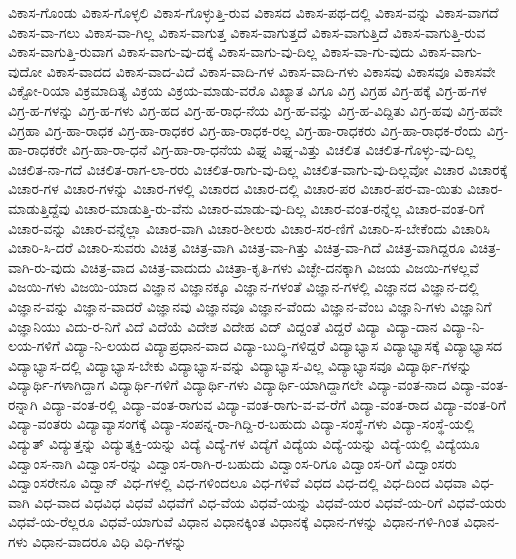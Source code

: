 {ವಿಕಾಸ-ಗೊಂಡು
ವಿಕಾಸ-ಗೊಳ್ಳಲಿ
ವಿಕಾಸ-ಗೊಳ್ಳುತ್ತಿ-ರುವ
ವಿಕಾಸದ
ವಿಕಾಸ-ಪಥ-ದಲ್ಲಿ
ವಿಕಾಸ-ವನ್ನು
ವಿಕಾಸ-ವಾಗದೆ
ವಿಕಾಸ-ವಾ-ಗಲು
ವಿಕಾಸ-ವಾ-ಗಿಲ್ಲ
ವಿಕಾಸ-ವಾಗುತ್ತ
ವಿಕಾಸ-ವಾಗುತ್ತದೆ
ವಿಕಾಸ-ವಾಗುತ್ತಿದೆ
ವಿಕಾಸ-ವಾಗುತ್ತಿ-ರುವ
ವಿಕಾಸ-ವಾಗುತ್ತಿ-ರುವಾಗ
ವಿಕಾಸ-ವಾಗು-ವು-ದಕ್ಕೆ
ವಿಕಾಸ-ವಾಗು-ವು-ದಿಲ್ಲ
ವಿಕಾಸ-ವಾ-ಗು-ವುದು
ವಿಕಾಸ-ವಾಗು-ವುದೋ
ವಿಕಾಸ-ವಾದದ
ವಿಕಾಸ-ವಾದ-ವಿದೆ
ವಿಕಾಸ-ವಾದಿ-ಗಳ
ವಿಕಾಸ-ವಾದಿ-ಗಳು
ವಿಕಾಸವು
ವಿಕಾಸವೂ
ವಿಕಾಸವೇ
ವಿಕ್ಟೋ-ರಿಯಾ
ವಿಕ್ರಮಾದಿತ್ಯ
ವಿಕ್ರಯ
ವಿಕ್ರಯ-ಮಾಡು-ವರೊ
ವಿಖ್ಯಾತ
ವಿಗೂ
ವಿಗ್ರ
ವಿಗ್ರಹ
ವಿಗ್ರ-ಹಕ್ಕೆ
ವಿಗ್ರ-ಹ-ಗಳ
ವಿಗ್ರ-ಹ-ಗಳನ್ನು
ವಿಗ್ರ-ಹ-ಗಳು
ವಿಗ್ರ-ಹದ
ವಿಗ್ರ-ಹ-ರಾಧ-ನೆಯ
ವಿಗ್ರ-ಹ-ವನ್ನು
ವಿಗ್ರ-ಹ-ವಿದ್ದಿತು
ವಿಗ್ರ-ಹವು
ವಿಗ್ರ-ಹವೇ
ವಿಗ್ರಹಾ
ವಿಗ್ರ-ಹಾ-ರಾಧಕ
ವಿಗ್ರ-ಹಾ-ರಾಧಕರ
ವಿಗ್ರ-ಹಾ-ರಾಧಕ-ರಲ್ಲ
ವಿಗ್ರ-ಹಾ-ರಾಧಕರು
ವಿಗ್ರ-ಹಾ-ರಾಧಕ-ರೆಂದು
ವಿಗ್ರ-ಹಾ-ರಾಧಕರೇ
ವಿಗ್ರ-ಹಾ-ರಾ-ಧನೆ
ವಿಗ್ರ-ಹಾ-ರಾ-ಧನೆಯ
ವಿಘ್ನ
ವಿಘ್ನ-ವಿತ್ತು
ವಿಚಲಿತ
ವಿಚಲಿತ-ಗೊಳ್ಳು-ವು-ದಿಲ್ಲ
ವಿಚಲಿತ-ನಾ-ಗದೆ
ವಿಚಲಿತ-ರಾಗ-ಲಾ-ರರು
ವಿಚಲಿತ-ರಾಗು-ವು-ದಿಲ್ಲ
ವಿಚಲಿತ-ವಾಗು-ವು-ದಿಲ್ಲವೋ
ವಿಚಾರ
ವಿಚಾರಕ್ಕೆ
ವಿಚಾರ-ಗಳ
ವಿಚಾರ-ಗಳನ್ನು
ವಿಚಾರ-ಗಳಲ್ಲಿ
ವಿಚಾರದ
ವಿಚಾರ-ದಲ್ಲಿ
ವಿಚಾರ-ಪರ
ವಿಚಾರ-ಪರ-ವಾ-ಯಿತು
ವಿಚಾರ-ಮಾಡುತ್ತಿದ್ದೆವು
ವಿಚಾರ-ಮಾಡುತ್ತಿ-ರು-ವೆನು
ವಿಚಾರ-ಮಾಡು-ವು-ದಿಲ್ಲ
ವಿಚಾರ-ವಂತ-ರನ್ನೆಲ್ಲ
ವಿಚಾರ-ವಂತ-ರಿಗೆ
ವಿಚಾರ-ವನ್ನು
ವಿಚಾರ-ವನ್ನೆಲ್ಲಾ
ವಿಚಾರ-ವಾಗಿ
ವಿಚಾರ-ಶೀಲರು
ವಿಚಾರ-ಸರ-ಣಿಗೆ
ವಿಚಾರಿ-ಸ-ಬೇಕೆಂದು
ವಿಚಾರಿಸಿ
ವಿಚಾರಿ-ಸಿ-ದರೆ
ವಿಚಾರಿ-ಸುವರು
ವಿಚಿತ್ರ
ವಿಚಿತ್ರ-ವಾಗಿ
ವಿಚಿತ್ರ-ವಾ-ಗಿತ್ತು
ವಿಚಿತ್ರ-ವಾ-ಗಿದೆ
ವಿಚಿತ್ರ-ವಾಗಿದ್ದರೂ
ವಿಚಿತ್ರ-ವಾಗಿ-ರು-ವುದು
ವಿಚಿತ್ರ-ವಾದ
ವಿಚಿತ್ರ-ವಾದುದು
ವಿಚಿತ್ರಾ-ಕೃತಿ-ಗಳು
ವಿಚ್ಛೇ-ದನಕ್ಕಾಗಿ
ವಿಜಯ
ವಿಜಯಿ-ಗಳಲ್ಲವೆ
ವಿಜಯಿ-ಗಳು
ವಿಜಯಿ-ಯಾದ
ವಿಜ್ಞಾನ
ವಿಜ್ಞಾನಕ್ಕೂ
ವಿಜ್ಞಾನ-ಗಳಂತೆ
ವಿಜ್ಞಾನ-ಗಳಲ್ಲಿ
ವಿಜ್ಞಾನದ
ವಿಜ್ಞಾನ-ದಲ್ಲಿ
ವಿಜ್ಞಾನ-ವನ್ನು
ವಿಜ್ಞಾನ-ವಾದರೆ
ವಿಜ್ಞಾನವು
ವಿಜ್ಞಾನವೂ
ವಿಜ್ಞಾನ-ವೆಂದು
ವಿಜ್ಞಾನ-ವೆಂಬ
ವಿಜ್ಞಾನಿ-ಗಳು
ವಿಜ್ಞಾನಿಗೆ
ವಿಜ್ಞಾನಿಯು
ವಿದು-ರ-ನಿಗೆ
ವಿದೆ
ವಿದೆಯೆ
ವಿದೇಶ
ವಿದೇಹ
ವಿದ್
ವಿದ್ದಂತೆ
ವಿದ್ದರೆ
ವಿದ್ಯಾ
ವಿದ್ಯಾ-ದಾನ
ವಿದ್ಯಾ-ನಿ-ಲಯ-ಗಳಿಗೆ
ವಿದ್ಯಾ-ನಿ-ಲಯದ
ವಿದ್ಯಾಪ್ರಧಾನ-ವಾದ
ವಿದ್ಯಾ-ಬುದ್ಧಿ-ಗಳಿದ್ದರೆ
ವಿದ್ಯಾಭ್ಯಾಸ
ವಿದ್ಯಾಭ್ಯಾಸಕ್ಕೆ
ವಿದ್ಯಾಭ್ಯಾಸದ
ವಿದ್ಯಾಭ್ಯಾಸ-ದಲ್ಲಿ
ವಿದ್ಯಾಭ್ಯಾಸ-ಬೇಕು
ವಿದ್ಯಾಭ್ಯಾಸ-ವನ್ನು
ವಿದ್ಯಾಭ್ಯಾಸ-ವಿಲ್ಲ
ವಿದ್ಯಾಭ್ಯಾಸವೂ
ವಿದ್ಯಾರ್ಥಿ-ಗಳನ್ನು
ವಿದ್ಯಾರ್ಥಿ-ಗಳಾಗಿದ್ದಾಗ
ವಿದ್ಯಾರ್ಥಿ-ಗಳಿಗೆ
ವಿದ್ಯಾರ್ಥಿ-ಗಳು
ವಿದ್ಯಾರ್ಥಿ-ಯಾಗಿದ್ದಾಗಲೇ
ವಿದ್ಯಾ-ವಂತ-ನಾದ
ವಿದ್ಯಾ-ವಂತ-ರನ್ನಾಗಿ
ವಿದ್ಯಾ-ವಂತ-ರಲ್ಲಿ
ವಿದ್ಯಾ-ವಂತ-ರಾಗುವ
ವಿದ್ಯಾ-ವಂತ-ರಾಗು-ವ-ವ-ರೆಗೆ
ವಿದ್ಯಾ-ವಂತ-ರಾದ
ವಿದ್ಯಾ-ವಂತ-ರಿಗೆ
ವಿದ್ಯಾ-ವಂತರು
ವಿದ್ಯಾವ್ಯಾಸಂಗಕ್ಕೆ
ವಿದ್ಯಾ-ಸಂಪನ್ನ-ರಾ-ಗಿದ್ದಿ-ರ-ಬಹುದು
ವಿದ್ಯಾ-ಸಂಸ್ಥೆ-ಗಳು
ವಿದ್ಯಾ-ಸಂಸ್ಥೆ-ಯಲ್ಲಿ
ವಿದ್ಯುತ್
ವಿದ್ಯುತ್ತನ್ನು
ವಿದ್ಯುತ್ಶಕ್ತಿ-ಯನ್ನು
ವಿದ್ಯೆ
ವಿದ್ಯೆ-ಗಳ
ವಿದ್ಯೆಗೆ
ವಿದ್ಯೆಯ
ವಿದ್ಯೆ-ಯನ್ನು
ವಿದ್ಯೆ-ಯಲ್ಲಿ
ವಿದ್ಯೆಯೂ
ವಿದ್ವಾಂಸ-ನಾಗಿ
ವಿದ್ವಾಂಸ-ರನ್ನು
ವಿದ್ವಾಂಸ-ರಾಗಿ-ರ-ಬಹುದು
ವಿದ್ವಾಂಸ-ರಿಗೂ
ವಿದ್ವಾಂಸ-ರಿಗೆ
ವಿದ್ವಾಂಸರು
ವಿದ್ವಾಂಸರೇನೂ
ವಿದ್ವಾನ್
ವಿಧ-ಗಳಲ್ಲಿ
ವಿಧ-ಗಳಿಂದಲೂ
ವಿಧ-ಗಳಿವೆ
ವಿಧದ
ವಿಧ-ದಲ್ಲಿ
ವಿಧ-ದಿಂದ
ವಿಧವಾ
ವಿಧ-ವಾಗಿ
ವಿಧ-ವಾದ
ವಿಧವಿಧ
ವಿಧವೆ
ವಿಧವೆಗೆ
ವಿಧ-ವೆಯ
ವಿಧವೆ-ಯನ್ನು
ವಿಧವೆ-ಯರ
ವಿಧವೆ-ಯ-ರಿಗೆ
ವಿಧವೆ-ಯರು
ವಿಧವೆ-ಯ-ರೆಲ್ಲರೂ
ವಿಧವೆ-ಯಾಗುವೆ
ವಿಧಾನ
ವಿಧಾನಕ್ಕಿಂತ
ವಿಧಾನಕ್ಕೆ
ವಿಧಾನ-ಗಳನ್ನು
ವಿಧಾನ-ಗಳಿ-ಗಿಂತ
ವಿಧಾನ-ಗಳು
ವಿಧಾನ-ವಾದರೂ
ವಿಧಿ
ವಿಧಿ-ಗಳನ್ನು
}
